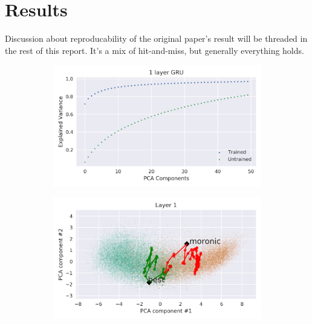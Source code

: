 \documentclass{article}
\begin{document}
\section{Results}

Discussion about reproducability of the original paper's result will be threaded in the rest of this report. It's a mix of hit-and-miss, but generally everything holds.

\begin{figure}[H]
  \centering
  \begin{subfigure}[b]{0.32\linewidth}
    \includegraphics[width=\textwidth]{../images/gru_1layer_explained_variance.png}
    \caption{}
    \label{fig:-images-gru_1layer_explained_variance-png}
  \end{subfigure}
  \begin{subfigure}[b]{0.32\linewidth}
    \includegraphics[width=\textwidth]{../images/gru_1layer_PCA.png}
    \caption{}
    \label{fig:-images-gru_1layer_PCA-png}
  \end{subfigure}
  \begin{subfigure}[b]{0.32\linewidth}

\end{subfigure}
\end{figure}
\end{document}
